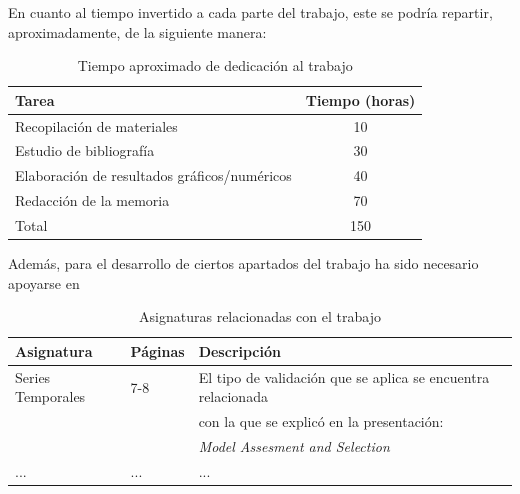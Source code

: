 \documentclass[12pt,twoside]{article}
\begin{document}
En cuanto al tiempo invertido a cada parte del trabajo, este se podría repartir, aproximadamente, de la siguiente manera:
\begin{table}[ht] 
\centering
\begin{tabular}{lc} 
  \hline
 Tarea & Tiempo (horas) \\ 
  \hline
Recopilación de materiales &   10 \\ 
Estudio de bibliografía &   30\\ 
Elaboración de resultados gráficos/numéricos &  40 \\ 
Redacción de la memoria &  70 \\
 \hline
Total & 150\\
\hline
\end{tabular}
\caption{Tiempo aproximado de dedicación al trabajo} \label{tab{02}}
\end{table}


Además, para el desarrollo de ciertos apartados del trabajo ha sido necesario apoyarse en
\begin{table}[ht] 
\centering
\begin{tabular}{llll} 
  \hline
 Asignatura & Páginas & Descripción  \\ 
  \hline
Series Temporales & 7-8 & El tipo de validación que se aplica se encuentra relacionada  \\ 
 &  &  con la que se explicó en la presentación: \\ 
 &  & \textit{Model Assesment and Selection} \\ 
... & ... & ...\\ 
\hline
\end{tabular}
\caption{Asignaturas relacionadas con el trabajo} \label{tab{03}}
\end{table}
\end{document}
